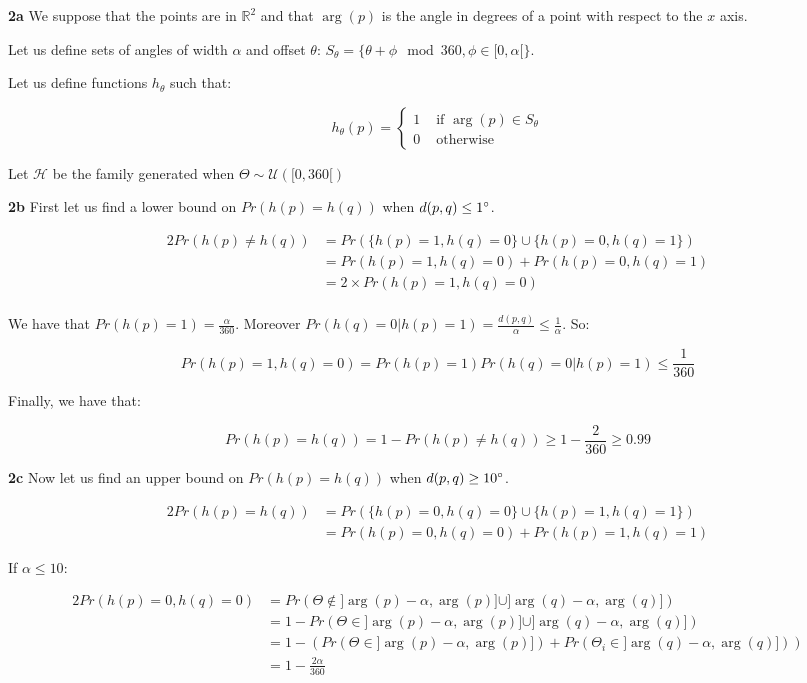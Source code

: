 \documentclass[10pt,a4paper]{article}
\theoremstyle{plain}
\begin{document}
\textbf{2a} We suppose that the points are in $\mathbb{R}^2$ and that $\arg(p)$ is the angle in degrees of a point with respect to the $x$ axis.

Let us define sets of angles of width $\alpha$ and offset $\theta$: $S_{\theta} = \{ \theta + \phi \mod 360, \phi \in [0, \alpha[ \}$.

Let us define functions $h_{\theta}$ such that:

$$
h_{\theta}(p) = \left\{\begin{array}{ll}
1 & \text{ if } \arg(p) \in S_{\theta} \\
0 & \text{ otherwise}
\end{array}\right.
$$

Let $\mathcal{H}$ be the family generated when $\Theta \sim \mathcal{U}([0, 360[)$

\textbf{2b} First let us find a lower bound on $Pr(h(p) = h(q))$ when $d(p, q) \leq 1\degree$.

\begin{alignat*}{2}
Pr(h(p) \neq h(q)) & = Pr(\{h(p) = 1, h(q) = 0\} \cup \{h(p) = 0, h(q) = 1\}) \\
& = Pr(h(p) = 1, h(q) = 0) + Pr(h(p) = 0, h(q) = 1) \\
& = 2 \times Pr(h(p) = 1, h(q) = 0) \\
\end{alignat*}

We have that $Pr(h(p) = 1) = \frac{\alpha}{360}$. Moreover $Pr(h(q) = 0 | h(p) = 1) = \frac{d(p, q)}{\alpha} \leq \frac{1}{\alpha}$. So:

$$
Pr(h(p) = 1, h(q) = 0) = Pr(h(p) = 1)Pr(h(q) = 0 | h(p) = 1)\leq \frac{1}{360}
$$

Finally, we have that:

$$
Pr(h(p) = h(q)) = 1 - Pr(h(p) \neq h(q)) \geq 1 - \frac{2}{360} \geq 0.99
$$

\textbf{2c} Now let us find an upper bound on $Pr(h(p) = h(q))$ when $d(p, q) \geq 10\degree$.

\begin{alignat*}{2}
Pr(h(p) = h(q)) & = Pr(\{h(p) = 0, h(q) = 0\} \cup \{h(p) = 1, h(q) = 1\}) \\
& = Pr(h(p) = 0, h(q) = 0) + Pr(h(p) = 1, h(q) = 1)
\end{alignat*}

If $\alpha \leq 10$:

\begin{alignat*}{2}
Pr(h(p) = 0, h(q) = 0) & = Pr(\Theta \not \in ]\arg(p)-\alpha, \arg(p)] \cup ]\arg(q)-\alpha, \arg(q)]) \\
& = 1 - Pr(\Theta \in ]\arg(p)-\alpha, \arg(p)] \cup ]\arg(q)-\alpha, \arg(q)]) \\
& = 1 - (Pr(\Theta \in ]\arg(p)-\alpha, \arg(p)]) + Pr(\Theta_i \in ]\arg(q)-\alpha, \arg(q)])) \\
& = 1 - \frac{2\alpha}{360}
\end{alignat*}
\end{document}
